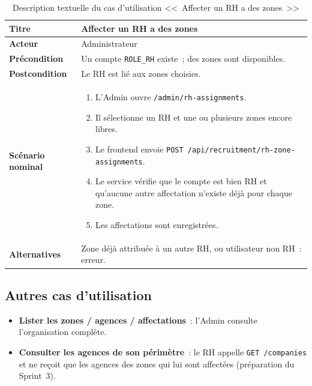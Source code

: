 \begin{table}[htbp]
  \centering
  \small
  \caption{Description textuelle du cas d'utilisation <<~Affecter un RH a des zones~>>}
  \label{tab:uc-assign-rh}
  \begin{tabular}{|p{3.0cm}|p{10.2cm}|}
    \hline
    \textbf{Titre} & Affecter un RH a des zones \\
    \hline
    \textbf{Acteur} & Administrateur \\
    \hline
    \textbf{Précondition} & Un compte \texttt{ROLE\_RH} existe~; des zones sont disponibles. \\
    \hline
    \textbf{Postcondition} & Le RH est lié aux zones choisies. \\
    \hline
    \textbf{Scénario nominal}
    &
    \begin{enumerate}[leftmargin=*,itemsep=0.15em,topsep=0.2em]
      \item L'Admin ouvre \texttt{/admin/rh-assignments}.
      \item Il sélectionne un RH et une ou plusieurs zones encore libres.
      \item Le frontend envoie \texttt{POST /api/recruitment/rh-zone-assignments}.
      \item Le service vérifie que le compte est bien RH et qu'aucune
            autre affectation n'existe déjà pour chaque zone.
      \item Les affectations sont enregistrées.
    \end{enumerate}
    \\
    \hline
    \textbf{Alternatives}
    & Zone déjà attribuée à un autre RH, ou utilisateur non RH~: erreur. \\
    \hline
  \end{tabular}
\end{table}


\subsection{Autres cas d'utilisation}

\begin{itemize}
  \item \textbf{Lister les zones / agences / affectations}~: l'Admin
        consulte l'organisation complète.
  \item \textbf{Consulter les agences de son périmètre}~: le RH appelle
        \texttt{GET /companies} et ne reçoit que les agences des zones
        qui lui sont affectées (préparation du Sprint~3).
\end{itemize}


